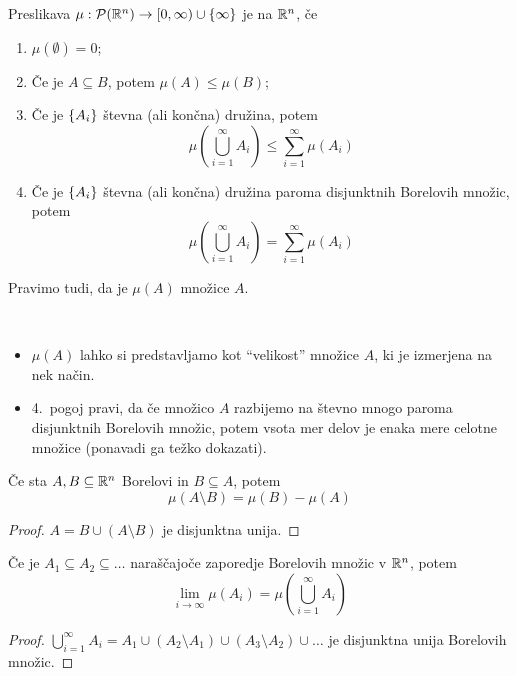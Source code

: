 \begin{definicija}
    Preslikava \(\mu: \mathcal{P}(\mathbb{R}^n) \to [0, \infty) \cup \left\{\infty\right\}\) je  na \(\mathbb{R}^n\), če 
    \begin{enumerate}
        \item \(\mu(\emptyset) = 0\);
        \item Če je \(A \subseteq B\), potem \(\mu(A) \leq \mu(B)\);
        \item Če je \(\left\{A_i\right\}\) števna (ali končna) družina, potem 
        \[\mu\left(\bigcup_{i=1}^\infty A_i\right) \leq \sum_{i=1}^{\infty} \mu (A_i)\]
        \item Če je \(\left\{A_i\right\}\) števna (ali končna) družina paroma disjunktnih Borelovih množic, potem 
        \[\mu\left(\bigcup_{i=1}^\infty A_i\right) = \sum_{i=1}^{\infty} \mu (A_i)\]
    \end{enumerate}
    Pravimo tudi, da je \(\mu(A)\)  množice \(A\).
\end{definicija}
\begin{opomba} \
    \begin{itemize}
        \item \(\mu(A)\) lahko si predstavljamo kot "`velikost"' množice \(A\), ki je izmerjena na nek način.
        \item 4.\ pogoj pravi, da če množico \(A\) razbijemo na števno mnogo paroma disjunktnih Borelovih množic, potem vsota mer delov je enaka mere celotne množice (ponavadi ga težko dokazati).
    \end{itemize}
\end{opomba}

\begin{lema}
    Če sta \(A, B \subseteq \mathbb{R}^n\) Borelovi in \(B \subseteq A\), potem
    \[\mu(A \setminus B) = \mu(B) - \mu(A)\]
\end{lema}

\begin{proof}
    \(A = B \cup (A \setminus B)\) je disjunktna unija.
\end{proof}

\begin{lema}
    Če je \(A_1 \subseteq A_2 \subseteq \ldots \) naraščajoče zaporedje Borelovih množic v \(\mathbb{R}^n\), potem 
    \[\lim_{i \to \infty} \mu(A_i) = \mu\left(\bigcup_{i=1}^\infty A_i\right)\]
\end{lema}

\begin{proof}
    \(\bigcup_{i=1}^\infty A_i = A_1 \cup (A_2 \setminus A_1) \cup (A_3 \setminus A_2) \cup \ldots\) je disjunktna unija Borelovih množic.
\end{proof}

